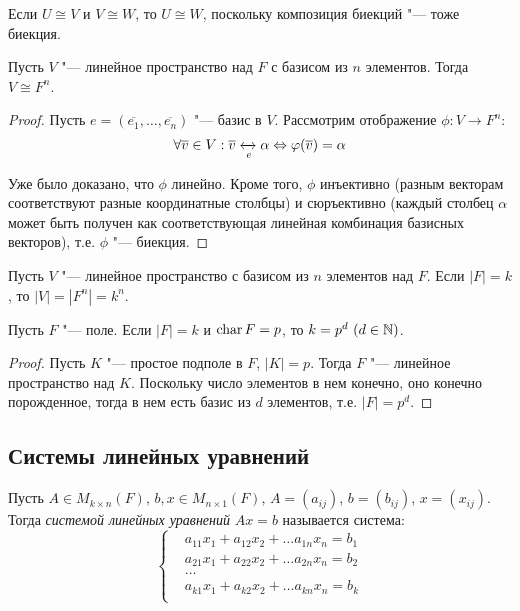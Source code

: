 \begin{note}
	Если $U \cong V$ и $V \cong W$, то $U \cong W$, поскольку композиция биекций "--- тоже биекция.
\end{note}

\begin{proposition}
	Пусть $V$ "--- линейное пространство над $F$ с базисом из $n$ элементов. Тогда $V \cong F^n$.
\end{proposition}

\begin{proof}
	Пусть $e = (\overline{e_1}, \dots, \overline{e_n})$ "--- базис в $V$. Рассмотрим отображение $\phi: V \rightarrow F^n$:
	\[\forall \overline{v} \in V: \overline{v} \xleftrightarrow[e]{} \alpha \Leftrightarrow \phi(\overline{v}) = \alpha\]
	
	Уже было доказано, что $\phi$ линейно. Кроме того, $\phi$ инъективно (разным векторам соответствуют разные координатные столбцы) и сюръективно (каждый столбец $\alpha$ может быть получен как соответствующая линейная комбинация базисных векторов), т.\:е. $\phi$ "--- биекция.
\end{proof}

\begin{corollary}
	Пусть $V$ "--- линейное пространство с базисом из $n$ элементов над $F$. Если $|F| = k$, то $|V| = |F^n| = k^n$.
\end{corollary}

\begin{corollary}
	Пусть $F$ "--- поле. Если $|F| = k$ и $\cha{F} = p$, то $k \hm{=} p^d~(d \in \mathbb{N})$.
\end{corollary}

\begin{proof}
	Пусть $K$ "--- простое подполе в $F$, $|K| = p$. Тогда $F$ "--- линейное пространство над $K$. Поскольку число элементов в нем конечно, оно конечно порожденное, тогда в нем есть базис из $d$ элементов, т.\:е. $|F| = p^d$.
\end{proof}

\subsection{Системы линейных уравнений}

\begin{definition}
	Пусть $A \in M_{k \times n}(F)$, $b, x \in M_{n \times 1}(F)$, $A = (a_{ij})$, $b = (b_{ij})$, $x = (x_{ij})$. Тогда \textit{системой линейных уравнений} $Ax = b$ называется система:
	\[
	\left\{
	\begin{aligned}
	&a_{11}x_1 + a_{12}x_2 + \dots a_{1n}x_n = b_1\\
	&a_{21}x_1 + a_{22}x_2 + \dots a_{2n}x_n = b_2\\
	&\dots\\
	&a_{k1}x_1 + a_{k2}x_2 + \dots a_{kn}x_n = b_k\\
	\end{aligned}
	\right.
	\]
\end{definition}

